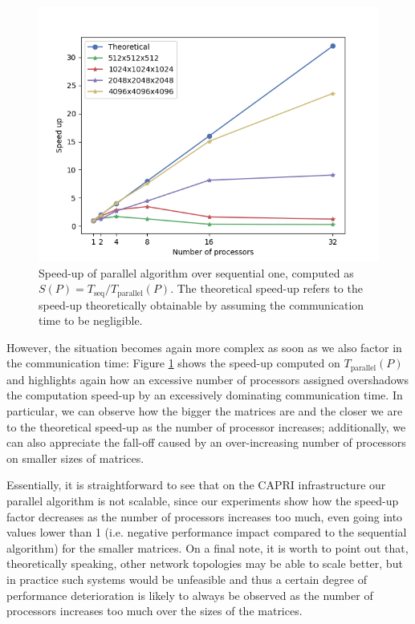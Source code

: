 \begin{figure}[hb!]
    \centering
    \includegraphics[width=0.8\linewidth]{figures/speedup.png}
    \caption{Speed-up of parallel algorithm over sequential one, computed as $S(P) = T_{\text{seq}}/T_{\text{parallel}}(P)$. The theoretical speed-up refers to the speed-up theoretically obtainable by assuming the communication time to be negligible.}
    \label{fig:speedup}
\end{figure}

However, the situation becomes again more complex as soon as we also factor in the communication time: Figure \ref{fig:speedup} shows the speed-up computed on $T_{\text{parallel}}(P)$ and highlights again how an excessive number of processors assigned overshadows the computation speed-up by an excessively dominating communication time. In particular, we can observe how the bigger the matrices are and the closer we are to the theoretical speed-up as the number of processor increases; additionally, we can also appreciate the fall-off caused by an over-increasing number of processors on smaller sizes of matrices.

Essentially, it is straightforward to see that on the CAPRI infrastructure our parallel algorithm is not scalable, since our experiments show how the speed-up factor decreases as the number of processors increases too much, even going into values lower than 1 (i.e. negative performance impact compared to the sequential algorithm) for the smaller matrices.
On a final note, it is worth to point out that, theoretically speaking, other network topologies may be able to scale better, but in practice such systems would be unfeasible and thus a certain degree of performance deterioration is likely to always be observed as the number of processors increases too much over the sizes of the matrices.